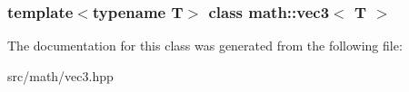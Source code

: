\subsubsection*{template$<$typename T$>$ class math::vec3$<$ T $>$}



The documentation for this class was generated from the following file:\begin{DoxyCompactItemize}
\item 
src/math/vec3.hpp\end{DoxyCompactItemize}
